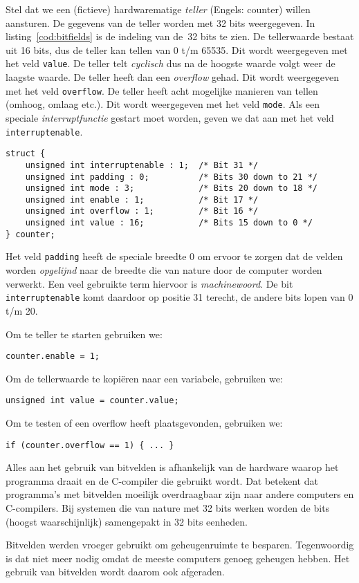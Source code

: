 Stel dat we een (fictieve) hardwarematige \textsl{teller} (Engels: counter) willen aansturen. De gegevens van de teller worden met 32 bits weergegeven. In listing~\ref{cod:bitfields} is de indeling van de~32 bits te zien. De tellerwaarde bestaat uit 16 bits, dus de teller kan tellen van 0 t/m 65535. Dit wordt weergegeven met het veld \texttt{value}. De teller telt \textsl{cyclisch} dus na de hoogste waarde volgt weer de laagste waarde. De teller heeft dan een \textsl{overflow} gehad. Dit wordt weergegeven met het veld \texttt{overflow}. De teller heeft acht mogelijke manieren van tellen (omhoog, omlaag etc.). Dit wordt weergegeven met het veld \texttt{mode}. Als een speciale \textsl{interruptfunctie} gestart moet worden, geven we dat aan met het veld \texttt{interruptenable}.

\begin{lstlisting}[caption=Voorbeeld van bitvelden.,label=cod:bitfields]
struct {
    unsigned int interruptenable : 1;  /* Bit 31 */
    unsigned int padding : 0;          /* Bits 30 down to 21 */
    unsigned int mode : 3;             /* Bits 20 down to 18 */
    unsigned int enable : 1;           /* Bit 17 */
    unsigned int overflow : 1;         /* Bit 16 */
    unsigned int value : 16;           /* Bits 15 down to 0 */
} counter;

\end{lstlisting}

Het veld \texttt{padding} heeft de speciale breedte 0 om ervoor te zorgen dat de velden worden \textsl{opgelijnd} naar de breedte die van nature door de computer worden verwerkt. Een veel gebruikte term hiervoor is \textsl{machinewoord}. De bit \texttt{interruptenable} komt daardoor op positie 31 terecht, de andere bits lopen van 0 t/m 20.


Om te teller te starten gebruiken we:

\hspace*{1em}\texttt{counter.enable = 1;}

Om de tellerwaarde te kopiëren naar een variabele, gebruiken we:

\hspace*{1em}\texttt{unsigned int value = counter.value;}

Om te testen of een overflow heeft plaatsgevonden, gebruiken we:

\hspace*{1em}\texttt{if (counter.overflow == 1) \{ ... \} }

Alles aan het gebruik van bitvelden is afhankelijk van de hardware waarop het programma draait en de C-compiler die gebruikt wordt. Dat betekent dat programma's met bitvelden moeilijk overdraagbaar zijn naar andere computers en C-compilers. Bij systemen die van nature met 32 bits werken worden de bits (hoogst waarschijnlijk) samengepakt in 32 bits eenheden.


Bitvelden werden vroeger gebruikt om geheugenruimte te besparen. Tegenwoordig is dat niet meer nodig omdat de meeste computers genoeg geheugen hebben. Het gebruik van bitvelden wordt daarom ook afgeraden.

\basic